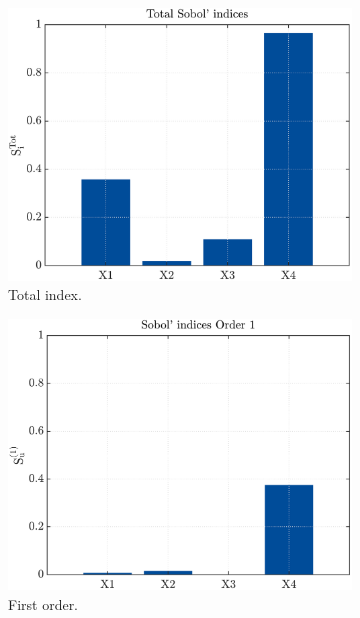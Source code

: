 \documentclass{elsarticle}
\begin{document}
\begin{figure}[hbtp]
\centering
	\begin{subfigure}[b]{.49\textwidth}
	\centering
	\includegraphics[width=\textwidth]{figures/total_type1.pdf}
	\caption{Total index.\label{fig:total_type1}}
	\end{subfigure}
	\hfill
	\begin{subfigure}[b]{.49\textwidth}
	\centering
	\includegraphics[width=\textwidth]{figures/first_type1.pdf}
	\caption{First order.\label{fig:first_type1}}
	\end{subfigure}\\
	\begin{subfigure}[b]{.49\textwidth}

\end{subfigure}
\end{figure}
\end{document}
